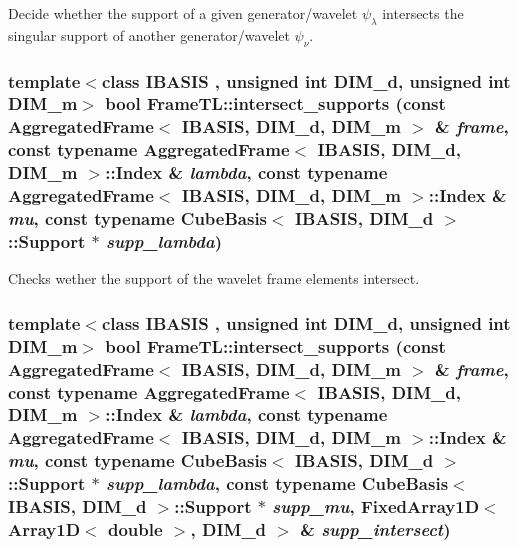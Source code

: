 Decide whether the support of a given generator/wavelet $\psi_\lambda$ intersects the singular support of another generator/wavelet $\psi_\nu$. \hypertarget{namespaceFrameTL_0b6d3a80be9f0dd032527c3c17ce3f62}{
\subsubsection[{intersect\_\-supports}]{\setlength{\rightskip}{0pt plus 5cm}template$<$class IBASIS , unsigned int DIM\_\-d, unsigned int DIM\_\-m$>$ bool FrameTL::intersect\_\-supports (const AggregatedFrame$<$ IBASIS, DIM\_\-d, DIM\_\-m $>$ \& {\em frame}, \/  const typename AggregatedFrame$<$ IBASIS, DIM\_\-d, DIM\_\-m $>$::Index \& {\em lambda}, \/  const typename AggregatedFrame$<$ IBASIS, DIM\_\-d, DIM\_\-m $>$::Index \& {\em mu}, \/  const typename CubeBasis$<$ IBASIS, DIM\_\-d $>$::Support $\ast$ {\em supp\_\-lambda})}}
\label{namespaceFrameTL_0b6d3a80be9f0dd032527c3c17ce3f62}


Checks wether the support of the wavelet frame elements intersect. \hypertarget{namespaceFrameTL_5aeecded043a910b0dae7228883304b3}{
\subsubsection[{intersect\_\-supports}]{\setlength{\rightskip}{0pt plus 5cm}template$<$class IBASIS , unsigned int DIM\_\-d, unsigned int DIM\_\-m$>$ bool FrameTL::intersect\_\-supports (const AggregatedFrame$<$ IBASIS, DIM\_\-d, DIM\_\-m $>$ \& {\em frame}, \/  const typename AggregatedFrame$<$ IBASIS, DIM\_\-d, DIM\_\-m $>$::Index \& {\em lambda}, \/  const typename AggregatedFrame$<$ IBASIS, DIM\_\-d, DIM\_\-m $>$::Index \& {\em mu}, \/  const typename CubeBasis$<$ IBASIS, DIM\_\-d $>$::Support $\ast$ {\em supp\_\-lambda}, \/  const typename CubeBasis$<$ IBASIS, DIM\_\-d $>$::Support $\ast$ {\em supp\_\-mu}, \/  FixedArray1D$<$ Array1D$<$ double $>$, DIM\_\-d $>$ \& {\em supp\_\-intersect})}}
\label{namespaceFrameTL_5aeecded043a910b0dae7228883304b3}



